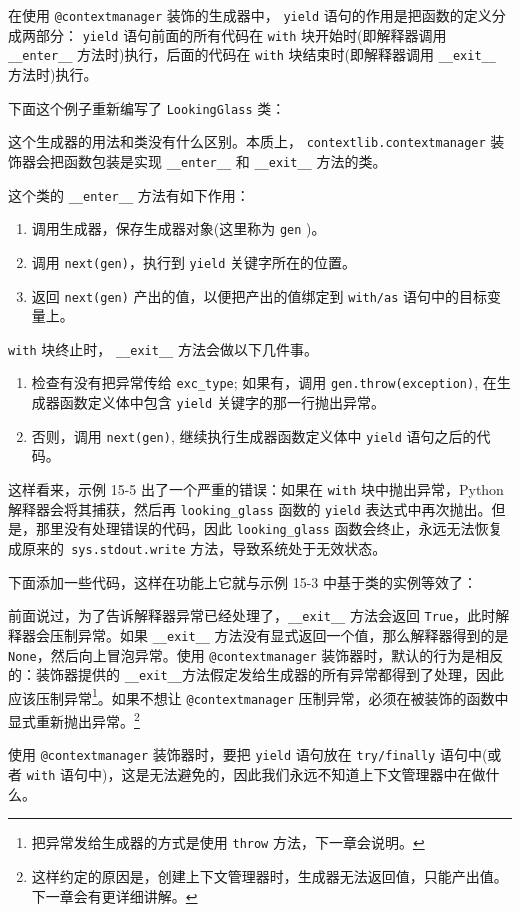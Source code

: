 在使用 \texttt{@contextmanager} 装饰的生成器中， \texttt{yield} 语句的作用是把函数的定义分成两部分： \texttt{yield} 语句前面的所有代码在 \texttt{with} 块开始时(即解释器调用 \texttt{\_\_enter\_\_} 方法时)执行，后面的代码在 \texttt{with} 块结束时(即解释器调用 \texttt{\_\_exit\_\_} 方法时)执行。

下面这个例子重新编写了 \texttt{LookingGlass} 类：



这个生成器的用法和类没有什么区别。本质上， \texttt{contextlib.contextmanager} 装饰器会把函数包装是实现 \texttt{\_\_enter\_\_} 和 \texttt{\_\_exit\_\_} 方法的类。

这个类的 \texttt{\_\_enter\_\_} 方法有如下作用：
\begin{enumerate}
    \item 调用生成器，保存生成器对象(这里称为 \texttt{gen} )。
    \item 调用 \texttt{next(gen)}，执行到 \texttt{yield} 关键字所在的位置。
    \item 返回 \texttt{next(gen)} 产出的值，以便把产出的值绑定到 \texttt{with/as} 语句中的目标变量上。
\end{enumerate}

\texttt{with} 块终止时， \texttt{\_\_exit\_\_} 方法会做以下几件事。
\begin{enumerate}
    \item 检查有没有把异常传给 \texttt{exc\_type}; 如果有，调用 \texttt{gen.throw(exception)}, 在生成器函数定义体中包含 \texttt{yield} 关键字的那一行抛出异常。
    \item 否则，调用 \texttt{next(gen)}, 继续执行生成器函数定义体中 \texttt{yield} 语句之后的代码。
\end{enumerate}

这样看来，示例 15-5 出了一个严重的错误：如果在 \texttt{with} 块中抛出异常，Python 解释器会将其捕获，然后再 \texttt{looking\_glass} 函数的 \texttt{yield} 表达式中再次抛出。但是，那里没有处理错误的代码，因此 \texttt{looking\_glass} 函数会终止，永远无法恢复成原来的\texttt{ sys.stdout.write} 方法，导致系统处于无效状态。

下面添加一些代码，这样在功能上它就与示例 15-3 中基于类的实例等效了：



前面说过，为了告诉解释器异常已经处理了，\texttt{\_\_exit\_\_} 方法会返回 \texttt{True}，此时解释器会压制异常。如果 \texttt{\_\_exit\_\_} 方法没有显式返回一个值，那么解释器得到的是 \texttt{None}，然后向上冒泡异常。使用 \texttt{@contextmanager} 装饰器时，默认的行为是相反的：装饰器提供的 \texttt{\_\_exit\_\_}方法假定发给生成器的所有异常都得到了处理，因此应该压制异常\footnote{把异常发给生成器的方式是使用 \texttt{throw} 方法，下一章会说明。}。如果不想让 \texttt{@contextmanager} 压制异常，必须在被装饰的函数中显式重新抛出异常。\footnote{这样约定的原因是，创建上下文管理器时，生成器无法返回值，只能产出值。下一章会有更详细讲解。}

使用 \texttt{@contextmanager} 装饰器时，要把 \texttt{yield} 语句放在 \texttt{try/finally} 语句中(或者 \texttt{with} 语句中)，这是无法避免的，因此我们永远不知道上下文管理器中在做什么。



\newpage